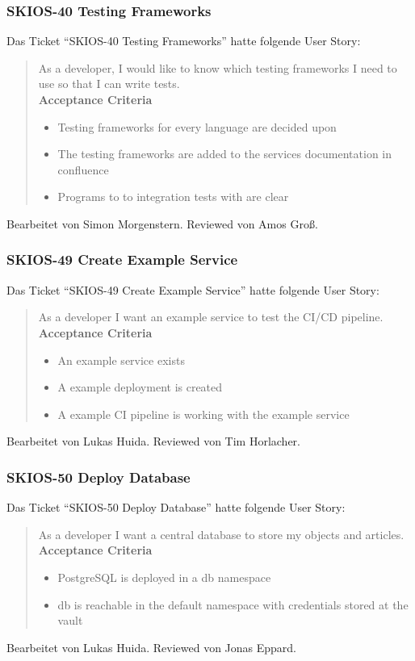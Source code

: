 \subsubsection{SKIOS-40 Testing Frameworks}
Das Ticket \enquote{SKIOS-40 Testing Frameworks} hatte folgende User Story:
\begin{quotation}
    As a developer, I would like to know which testing frameworks I need to use so that I can write tests. \\
\textbf{Acceptance Criteria}
\begin{itemize}
    \item Testing frameworks for every language are decided upon
    \item The testing frameworks are added to the services documentation in confluence
    \item Programs to to integration tests with are clear
\end{itemize}
\end{quotation}
Bearbeitet von Simon Morgenstern.
Reviewed von Amos Groß.

\subsubsection{SKIOS-49 Create Example Service}
Das Ticket \enquote{SKIOS-49 Create Example Service} hatte folgende User Story:
\begin{quotation}
    As a developer I want an example service to test the CI/CD pipeline. \\
    \textbf{Acceptance Criteria}
    \begin{itemize}
        \item An example service exists
        \item A example deployment is created
        \item A example CI pipeline is working with the example service
    \end{itemize}
\end{quotation}
Bearbeitet von Lukas Huida.
Reviewed von Tim Horlacher.

\subsubsection{SKIOS-50 Deploy Database}
Das Ticket \enquote{SKIOS-50 Deploy Database} hatte folgende User Story:
\begin{quotation}
    As a developer I want a central database to store my objects and articles. \\
    \textbf{Acceptance Criteria}
    \begin{itemize}
        \item PostgreSQL is deployed in a db namespace
        \item db is reachable in the default namespace with credentials stored at the vault
    \end{itemize}
\end{quotation}
Bearbeitet von Lukas Huida.
Reviewed von Jonas Eppard.

